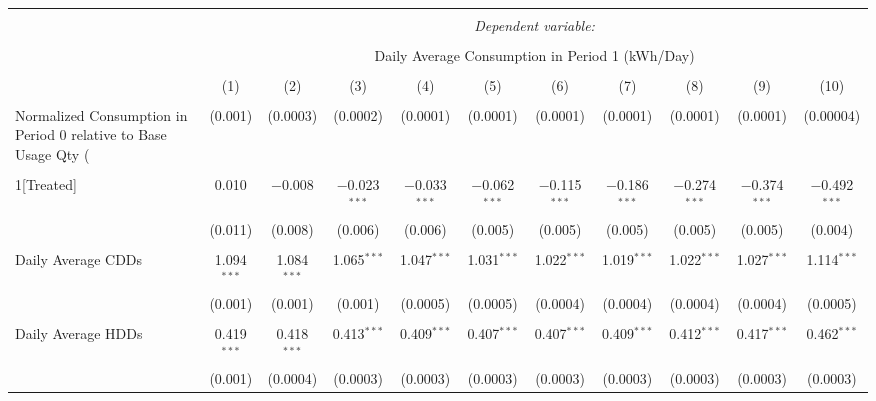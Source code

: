 
\begin{table}[!htbp] \centering 
  \caption{} 
  \label{} 
\small 
\begin{tabular}{@{\extracolsep{5pt}}lcccccccccc} 
\\[-1.8ex]\hline 
\hline \\[-1.8ex] 
 & \multicolumn{10}{c}{\textit{Dependent variable:}} \\ 
\cline{2-11} 
\\[-1.8ex] & \multicolumn{10}{c}{Daily Average Consumption in Period 1 (kWh/Day)} \\ 
\\[-1.8ex] & (1) & (2) & (3) & (4) & (5) & (6) & (7) & (8) & (9) & (10)\\ 
\hline \\[-1.8ex] 
 Normalized Consumption in Period 0 relative to Base Usage Qty (%
  & (0.001) & (0.0003) & (0.0002) & (0.0001) & (0.0001) & (0.0001) & (0.0001) & (0.0001) & (0.0001) & (0.00004) \\ 
  & & & & & & & & & & \\ 
 1[Treated] & 0.010 & $-$0.008 & $-$0.023$^{***}$ & $-$0.033$^{***}$ & $-$0.062$^{***}$ & $-$0.115$^{***}$ & $-$0.186$^{***}$ & $-$0.274$^{***}$ & $-$0.374$^{***}$ & $-$0.492$^{***}$ \\ 
  & (0.011) & (0.008) & (0.006) & (0.006) & (0.005) & (0.005) & (0.005) & (0.005) & (0.005) & (0.004) \\ 
  & & & & & & & & & & \\ 
 Daily Average CDDs & 1.094$^{***}$ & 1.084$^{***}$ & 1.065$^{***}$ & 1.047$^{***}$ & 1.031$^{***}$ & 1.022$^{***}$ & 1.019$^{***}$ & 1.022$^{***}$ & 1.027$^{***}$ & 1.114$^{***}$ \\ 
  & (0.001) & (0.001) & (0.001) & (0.0005) & (0.0005) & (0.0004) & (0.0004) & (0.0004) & (0.0004) & (0.0005) \\ 
  & & & & & & & & & & \\ 
 Daily Average HDDs & 0.419$^{***}$ & 0.418$^{***}$ & 0.413$^{***}$ & 0.409$^{***}$ & 0.407$^{***}$ & 0.407$^{***}$ & 0.409$^{***}$ & 0.412$^{***}$ & 0.417$^{***}$ & 0.462$^{***}$ \\ 
  & (0.001) & (0.0004) & (0.0003) & (0.0003) & (0.0003) & (0.0003) & (0.0003) & (0.0003) & (0.0003) & (0.0003) \\ 

\end{tabular}
\end{table}
